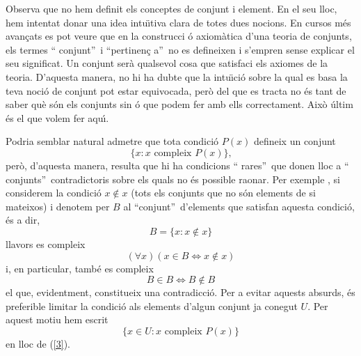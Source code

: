 \begin{obs}
Observa que no hem definit els conceptes de conjunt i element. En el seu
lloc, hem intentat donar una idea intu\"{\i}tiva clara de totes dues
nocions. En cursos m\'{e}s avan\c{c}ats es pot veure que en la construcci%
\'{o} axiom\`{a}tica d'una teoria de conjunts, els termes \textquotedblleft
conjunt\textquotedblright\ i \textquotedblleft pertinen\c{c}%
a\textquotedblright\ no es defineixen i s'empren sense explicar el seu
significat. Un conjunt ser\`{a} qualsevol cosa que satisfaci els axiomes de
la teoria. D'aquesta manera, no hi ha dubte que la intu\"{\i}ci\'{o} sobre
la qual es basa la teva noci\'{o} de conjunt pot estar equivocada, per\`{o}
del que es tracta no \'{e}s tant de saber qu\`{e} s\'{o}n els conjunts sin%
\'{o} que podem fer amb ells correctament. Aix\`{o} \'{u}ltim \'{e}s el que
volem fer aqu\'{\i}.
\end{obs}

\begin{obs}
Podria semblar natural admetre que tota condici\'{o} $P(x)$ defineix un
conjunt%
\begin{equation}
\{x:x\text{ compleix }P(x)\}\text{,}   \label{3}
\end{equation}
per\`{o}, d'aquesta manera, resulta que hi ha condicions \textquotedblleft
rares\textquotedblright\ que donen lloc a \textquotedblleft
conjunts\textquotedblright\ contradictoris sobre els quals no \'{e}s
possible raonar. Per exemple , si considerem la condici\'{o} $x\notin x$
(tots els conjunts que no s\'{o}n elements de si mateixos) i denotem per $B$
al \textquotedblleft conjunt\textquotedblright\ d'elements que satisfan
aquesta condici\'{o}, \'{e}s a dir,%
\begin{equation*}
B=\{x:x\notin x\}
\end{equation*}
llavors es compleix%
\begin{equation*}
\left( \forall x\right) (x\in B\Longleftrightarrow x\notin x)
\end{equation*}
i, en particular, tamb\'{e} es compleix%
\begin{equation*}
B\in B\Longleftrightarrow B\notin B
\end{equation*}
el que, evidentment, constitueix una contradicci\'{o}. Per a evitar aquests
absurds, \'{e}s preferible limitar la condici\'{o} als elements d'algun
conjunt ja conegut $U$. Per aquest motiu hem escrit%
\begin{equation*}
\{x\in U:x\text{ compleix }P(x)\text{\}}
\end{equation*}
en lloc de (\ref{3}).
\end{obs}

